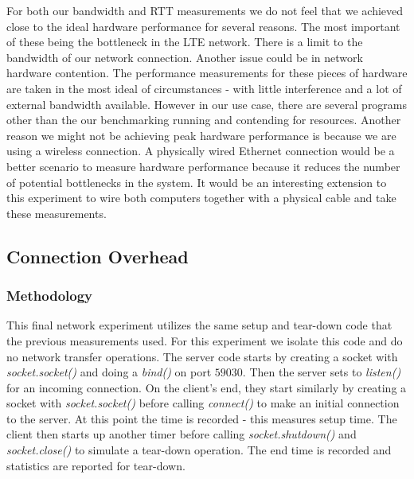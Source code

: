 \documentclass[sigconf]{acmart}
\begin{document}
For both our bandwidth and RTT measurements we do not feel that we achieved close to the ideal hardware performance for several reasons. The most important of these being the bottleneck in the LTE network. There is a limit to the bandwidth of our network connection. Another issue could be in network hardware contention. The performance measurements for these pieces of hardware are taken in the most ideal of circumstances - with little interference and a lot of external bandwidth available. However in our use case, there are several programs other than the our benchmarking running and contending for resources. Another reason we might not be achieving peak hardware performance is because we are using a wireless connection. A physically wired Ethernet connection would be a better scenario to measure hardware performance because it reduces the number of potential bottlenecks in the system. It would be an interesting extension to this experiment to wire both computers together with a physical cable and take these measurements.

\subsection{Connection Overhead}
\subsubsection{Methodology}
This final network experiment utilizes the same setup and tear-down code that the previous measurements used. For this experiment we isolate this code and do no network transfer operations. The server code starts by creating a socket with \textit{socket.socket()} and doing a \textit{bind()} on port $59030$. Then the server sets to \textit{listen()} for an incoming connection. On the client's end, they start similarly by creating a socket with \textit{socket.socket()} before calling \textit{connect()} to make an initial connection to the server. At this point the time is recorded - this measures setup time. The client then starts up another timer before calling \textit{socket.shutdown()} and \textit{socket.close()} to simulate a tear-down operation. The end time is recorded and statistics are reported for tear-down.
\end{document}
